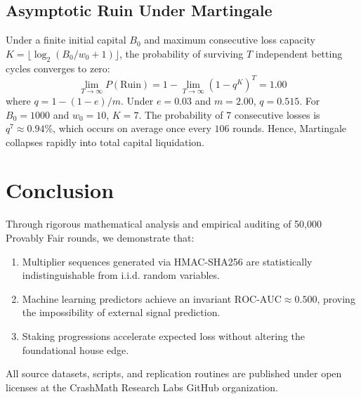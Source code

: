 \documentclass[10pt,journal,compsoc,twocolumn]{article}
\begin{document}
\subsection{Asymptotic Ruin Under Martingale}
Under a finite initial capital $B_0$ and maximum consecutive loss capacity $K = \lfloor \log_2(B_0 / w_0 + 1) \rfloor$, the probability of surviving $T$ independent betting cycles converges to zero:
\begin{equation}
    \lim_{T \to \infty} P(\text{Ruin}) = 1 - \lim_{T \to \infty} (1 - q^K)^T = 1.00
\end{equation}
where $q = 1 - (1-e)/m$. Under $e = 0.03$ and $m = 2.00$, $q = 0.515$. For $B_0 = 1000$ and $w_0 = 10$, $K = 7$. The probability of 7 consecutive losses is $q^7 \approx 0.94\%$, which occurs on average once every $106$ rounds. Hence, Martingale collapses rapidly into total capital liquidation.

\section{Conclusion}
Through rigorous mathematical analysis and empirical auditing of 50,000 Provably Fair rounds, we demonstrate that:
\begin{enumerate}
    \item Multiplier sequences generated via HMAC-SHA256 are statistically indistinguishable from i.i.d. random variables.
    \item Machine learning predictors achieve an invariant $\text{ROC-AUC} \approx 0.500$, proving the impossibility of external signal prediction.
    \item Staking progressions accelerate expected loss without altering the foundational house edge.
\end{enumerate}
All source datasets, scripts, and replication routines are published under open licenses at the CrashMath Research Labs GitHub organization.



\end{document}
